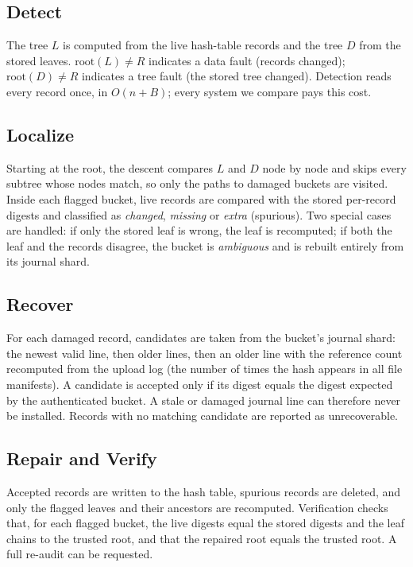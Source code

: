 \documentclass[conference]{IEEEtran}
\begin{document}
\subsection{Detect}
The tree $L$ is computed from the live hash-table records and the tree $D$ from the stored leaves. $\mathrm{root}(L) \neq R$ indicates a data fault (records changed); $\mathrm{root}(D) \neq R$ indicates a tree fault (the stored tree changed). Detection reads every record once, in $O(n + B)$; every system we compare pays this cost.

\subsection{Localize}
Starting at the root, the descent compares $L$ and $D$ node by node and skips every subtree whose nodes match, so only the paths to damaged buckets are visited. Inside each flagged bucket, live records are compared with the stored per-record digests and classified as \emph{changed}, \emph{missing} or \emph{extra} (spurious). Two special cases are handled: if only the stored leaf is wrong, the leaf is recomputed; if both the leaf and the records disagree, the bucket is \emph{ambiguous} and is rebuilt entirely from its journal shard.

\subsection{Recover}
For each damaged record, candidates are taken from the bucket's journal shard: the newest valid line, then older lines, then an older line with the reference count recomputed from the upload log (the number of times the hash appears in all file manifests). A candidate is accepted only if its digest equals the digest expected by the authenticated bucket. A stale or damaged journal line can therefore never be installed. Records with no matching candidate are reported as unrecoverable.

\subsection{Repair and Verify}
Accepted records are written to the hash table, spurious records are deleted, and only the flagged leaves and their ancestors are recomputed. Verification checks that, for each flagged bucket, the live digests equal the stored digests and the leaf chains to the trusted root, and that the repaired root equals the trusted root. A full re-audit can be requested.
\end{document}
